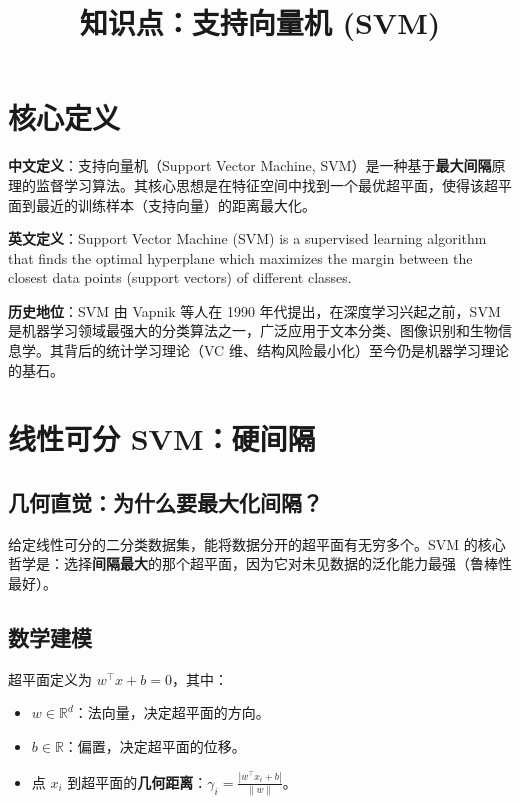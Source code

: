 \documentclass[12pt, a4paper]{article}
\title{知识点：支持向量机 (SVM)}
\author{}
\date{}
\begin{document}
\maketitle

\section{核心定义}
\textbf{中文定义}：支持向量机（Support Vector Machine, SVM）是一种基于\textbf{最大间隔}原理的监督学习算法。其核心思想是在特征空间中找到一个最优超平面，使得该超平面到最近的训练样本（支持向量）的距离最大化。

\textbf{英文定义}：Support Vector Machine (SVM) is a supervised learning algorithm that finds the optimal hyperplane which maximizes the margin between the closest data points (support vectors) of different classes.

\textbf{历史地位}：SVM 由 Vapnik 等人在 1990 年代提出，在深度学习兴起之前，SVM 是机器学习领域最强大的分类算法之一，广泛应用于文本分类、图像识别和生物信息学。其背后的统计学习理论（VC 维、结构风险最小化）至今仍是机器学习理论的基石。

\section{线性可分 SVM：硬间隔}

\subsection{几何直觉：为什么要最大化间隔？}
给定线性可分的二分类数据集，能将数据分开的超平面有无穷多个。SVM 的核心哲学是：选择\textbf{间隔最大}的那个超平面，因为它对未见数据的泛化能力最强（鲁棒性最好）。

\subsection{数学建模}
超平面定义为 $w^\top x + b = 0$，其中：
\begin{itemize}
    \item $w \in \mathbb{R}^d$：法向量，决定超平面的方向。
    \item $b \in \mathbb{R}$：偏置，决定超平面的位移。
    \item 点 $x_i$ 到超平面的\textbf{几何距离}：$\gamma_i = \frac{|w^\top x_i + b|}{\|w\|}$。
\end{itemize}
\end{document}
